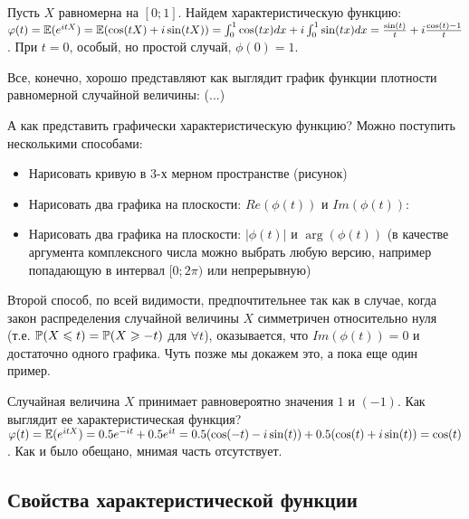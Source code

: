 {\begin{myex} Пусть $X$ равномерна на $[0;1]$. Найдем характеристическую функцию: $\phi(t)=\E(e^{itX})=\E(\cos(tX)+i\sin(tX))=\int_{0}^{1}\cos(tx)dx+i\int_{0}^{1}\sin(tx)dx=\frac{\sin(t)}{t}+i\frac{\cos(t)-1}{t}$. При $t=0$, особый, но простой случай, $\phi(0)=1$.
\end{myex}

Все, конечно, хорошо представляют как выглядит график функции плотности равномерной случайной величины:
(...)

А как представить графически характеристическую функцию? Можно поступить несколькими способами:

\begin{itemize}
\item Нарисовать кривую в 3-х мерном пространстве (рисунок)
\item Нарисовать два графика на плоскости: $Re(\phi(t))$ и $Im(\phi(t))$:
\item Нарисовать два графика на плоскости: $|\phi(t)|$ и $\arg(\phi(t))$ (в качестве аргумента комплексного числа можно выбрать любую версию, например попадающую в интервал $[0;2\pi)$ или непрерывную)
\end{itemize}

Второй способ, по всей видимости, предпочтительнее так как в случае, когда закон распределения случайной величины $X$ симметричен относительно нуля (т.е. $\P(X\leq t)=\P(X\geq -t)$ для $\forall t$), оказывается, что $Im(\phi(t))=0$ и достаточно одного графика. Чуть позже мы докажем это, а пока еще один пример.

\begin{myex} Случайная величина $X$ принимает равновероятно значения $1$ и $(-1)$. Как выглядит ее характеристическая функция? $\phi(t)=\E(e^{itX})=0.5e^{-it}+0.5e^{it}=0.5(\cos(-t)-i\sin(t))+0.5(\cos(t)+i\sin(t))=\cos(t)$. Как и было обещано, мнимая часть отсутствует.
\end{myex}




}\subsection{Свойства характеристической функции} 
